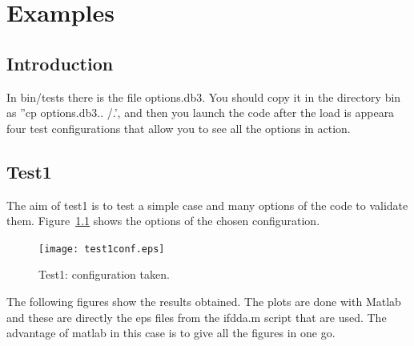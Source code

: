 \chapter{Examples}\label{chaptest}

\minitoc

\section{Introduction}

In bin/tests there is the file options.db3. You should copy it in the
directory bin as ''cp options.db3.. /.', and then you launch the code
after the load is appeara four test configurations that allow you to
see all the options in action.



\section{Test1}

The aim of test1 is to test a simple case and many options of the code
to validate them. Figure~\ref{test1conf} shows the options of the
chosen configuration.

\begin{figure}[H]
\begin{center}
  \texttt{[image: test1conf.eps]}
\end{center}
\caption{Test1: configuration taken.}
\label{test1conf}
\end{figure}

The following figures show the results obtained. The plots are done
with Matlab and these are directly the eps files from the ifdda.m
script that are used. The advantage of matlab in this case is to give
all the figures in one go.

